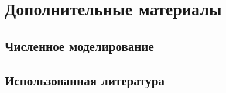 \chapter{Дополнительные материалы}
\section{Численное моделирование}
\label{numeric_modeling}

\pagebreak
\section{Использованная литература}
\label{literature}
